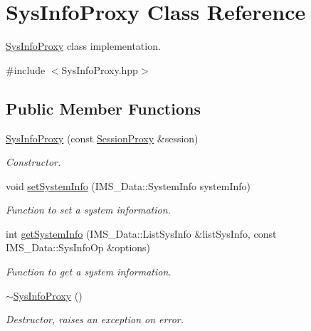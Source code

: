 \hypertarget{classSysInfoProxy}{
\section{SysInfoProxy Class Reference}
\label{classSysInfoProxy}
}


\hyperlink{classSysInfoProxy}{SysInfoProxy} class implementation.  




{\ttfamily \#include $<$SysInfoProxy.hpp$>$}

\subsection*{Public Member Functions}
\begin{DoxyCompactItemize}
\item 
\hyperlink{classSysInfoProxy_a7982c2f22cb113832d329f1a04b1ff9e}{SysInfoProxy} (const \hyperlink{classSessionProxy}{SessionProxy} \&session)
\begin{DoxyCompactList}\small\item\em Constructor. \item\end{DoxyCompactList}\item 
void \hyperlink{classSysInfoProxy_ac04cab2d613a1d8a15dd6916b6cc55a6}{setSystemInfo} (IMS\_\-Data::SystemInfo systemInfo)
\begin{DoxyCompactList}\small\item\em Function to set a system information. \item\end{DoxyCompactList}\item 
int \hyperlink{classSysInfoProxy_a2f15ab22d0d755d5c1e0edea5d0ffedc}{getSystemInfo} (IMS\_\-Data::ListSysInfo \&listSysInfo, const IMS\_\-Data::SysInfoOp \&options)
\begin{DoxyCompactList}\small\item\em Function to get a system information. \item\end{DoxyCompactList}\item 
\hypertarget{classSysInfoProxy_a32bcf93c458e8c2e53e5dfc8780239ad}{
\hyperlink{classSysInfoProxy_a32bcf93c458e8c2e53e5dfc8780239ad}{$\sim$SysInfoProxy} ()}
\label{classSysInfoProxy_a32bcf93c458e8c2e53e5dfc8780239ad}

\begin{DoxyCompactList}\small\item\em Destructor, raises an exception on error. \item\end{DoxyCompactList}\end{DoxyCompactItemize}
